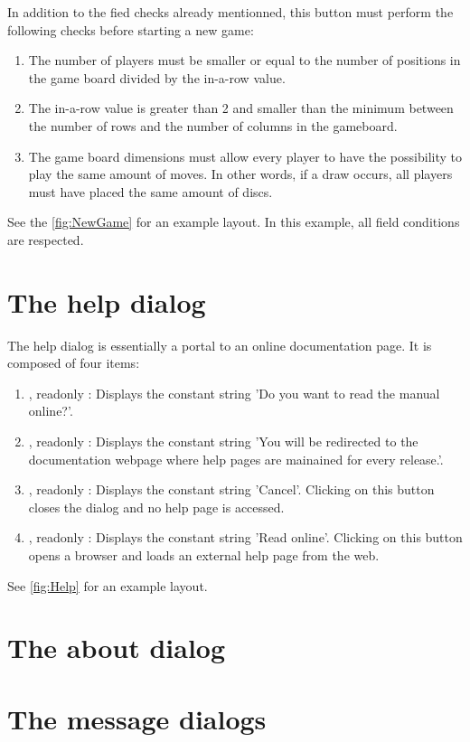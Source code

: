   In addition to the fied checks already mentionned, this button must perform the
  following checks before starting a new game:

  \begin{enumerate}
    \item The number of players must be smaller or equal to the number of positions
          in the game board divided by the in-a-row value.
    \item The in-a-row value is greater than 2 and smaller than the minimum between
          the number of rows and the number of columns in the gameboard.
    \item The game board dimensions must allow every player to have the possibility
          to play the same amount of moves. In other words, if a draw occurs, all
          players must have placed the same amount of discs.
  \end{enumerate}

  \noindent See the \cref{fig:NewGame} for an example layout. In this example, all
  field conditions are respected.


\section{The help dialog} \label{dlg:Help}
The help dialog is essentially a portal to an online documentation page. It is
composed of four items:

\begin{enumerate}
  \item {},  readonly : Displays the constant string 'Do you want
                                 to read the manual online?'.
  \item {},  readonly : Displays the constant string 'You will be
                                 redirected to the documentation webpage
                                 where help pages are mainained for every
                                 release.'.
  \item {}, readonly : Displays the constant string 'Cancel'.
                                 Clicking on this button closes the dialog
                                 and no help page is accessed.
  \item {}, readonly : Displays the constant string 'Read online'.
                                 Clicking on this button opens a browser
                                 and loads an external help page from the web.
\end{enumerate}

See \cref{fig:Help} for an example layout.


\section{The about  dialog} \label{dlg:AboutCX}
\section{The message dialogs} \label{dlg::message}

